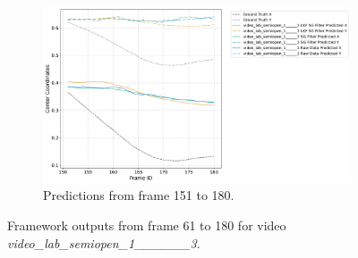 \documentclass[12pt,oneside]{book} %
\begin{document}
\begin{figure}[H]
    \vfill
    \begin{subfigure}[t]{0.8\textwidth}
        \includegraphics[width=\textwidth]{figures/video_lab_semiopen_1______3_Group_3_Trajectories.png}
        \caption{Predictions from frame 151 to 180.}
        \label{fig:framework-video_lab_semiopen_1_3-3}
    \end{subfigure}
    \caption{Framework outputs from frame 61 to 180 for video \textit{video\_lab\_semiopen\_1\_\_\_\_\_\_3}.}
    \label{fig:framework-video_lab_semiopen_1_3}
\end{figure}
\end{document}
